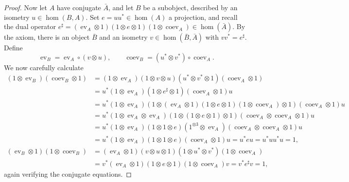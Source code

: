 \documentclass[a4paper,11pt]{article}
\theoremstyle{plain}
\theoremstyle{remark}
\newcommand{\ev}{\operatorname{ev}}
\newcommand{\coev}{\operatorname{coev}}
\newcommand{\conj}[1]{\bar{#1}}
\begin{document}
\begin{proof}
Now let $A$ have conjugate $\conj{A}$, and let $B$ be a subobject, described by an isometry $u\in\hom(B,A)$.  Set $e = uu^*\in\hom(A)$ a projection, and recall the dual operator $e^\sharp = (\ev_A\otimes 1)(1\otimes e\otimes 1)(1\otimes\coev_A) \in \hom(\conj{A})$.  By the axiom, there is an object $\conj{B}$ and an isometry $v\in\hom(\conj B, \conj A)$ with $vv^* = e^\sharp$.  Define
\[ \ev_B = \ev_A \circ (v\otimes u), \qquad \coev_B = (u^*\otimes v^*)\circ \coev_A. \]
We now carefully calculate
\begin{align*}
(1\otimes\ev_B)(\coev_B\otimes 1)
&= (1\otimes\ev_A)(1\otimes v\otimes u)(u^*\otimes v^*\otimes 1) (\coev_A\otimes 1) \\
&= u^* (1\otimes\ev_A) (1\otimes e^\sharp\otimes 1) (\coev_A\otimes 1) u \\
&= u^* (1\otimes\ev_A) (1\otimes (\ev_A\otimes 1)(1\otimes e\otimes 1)(1\otimes\coev_A) \otimes 1) (\coev_A\otimes 1) u \\
&= u^* (1\otimes\ev_A\otimes\ev_A) (1\otimes (1\otimes e\otimes 1) \otimes 1) (\coev_A\otimes\coev_A\otimes 1) u \\
&= u^* (1\otimes\ev_A)(1\otimes 1\otimes e) (1^{\otimes 3}\otimes\ev_A)(\coev_A\otimes\coev_A\otimes 1) u \\
&= u^* (1\otimes\ev_A)(1\otimes 1\otimes e) (\coev_A\otimes 1) u
= u^* e u = u^* u u^* u = 1,
\\
(\ev_B \otimes 1)(1 \otimes \coev_B)
&= (\ev_A\otimes 1)(v\otimes u\otimes 1)(1\otimes u^*\otimes v^*)(1\otimes\coev_A) \\
&= v^*  (\ev_A\otimes 1)(1\otimes e \otimes 1)(1\otimes\coev_A)  v
= v^* e^\sharp v = 1,
\end{align*}
again verifying the conjugate equations.
\end{proof}
\end{document}
